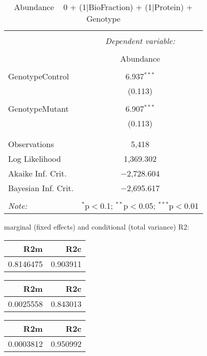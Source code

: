 \documentclass[11pt]{report}
\begin{document}
\begin{table}[!htbp] \centering 
  \caption{Abundance ~ 0 + (1|BioFraction) + (1|Protein) + Genotype} 
  \label{} 
\begin{tabular}{@{\extracolsep{5pt}}lc} 
\\[-1.8ex]\hline 
\hline \\[-1.8ex] 
 & \multicolumn{1}{c}{\textit{Dependent variable:}} \\ 
\cline{2-2} 
\\[-1.8ex] & Abundance \\ 
\hline \\[-1.8ex] 
 GenotypeControl & 6.937$^{***}$ \\ 
  & (0.113) \\ 
  & \\ 
 GenotypeMutant & 6.907$^{***}$ \\ 
  & (0.113) \\ 
  & \\ 
\hline \\[-1.8ex] 
Observations & 5,418 \\ 
Log Likelihood & 1,369.302 \\ 
Akaike Inf. Crit. & $-$2,728.604 \\ 
Bayesian Inf. Crit. & $-$2,695.617 \\ 
\hline 
\hline \\[-1.8ex] 
\textit{Note:}  & \multicolumn{1}{r}{$^{*}$p$<$0.1; $^{**}$p$<$0.05; $^{***}$p$<$0.01} \\ 
\end{tabular} 
\end{table} 
marginal (fixed effects) and conditional (total variance) R2:

\begin{tabular}{r|r}
\hline
R2m & R2c\\
\hline
0.8146475 & 0.903911\\
\hline
\end{tabular}

\begin{tabular}{r|r}
\hline
R2m & R2c\\
\hline
0.0025558 & 0.843013\\
\hline
\end{tabular}

\begin{tabular}{r|r}
\hline
R2m & R2c\\
\hline
0.0003812 & 0.950992\\
\hline
\end{tabular}
\end{document}
